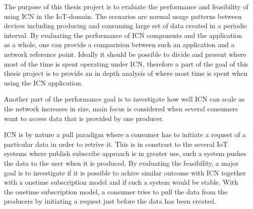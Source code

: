 The purpose of this thesis project is to evaluate the performance and feasibility of using ICN in the IoT-domain. The scenarios are normal usage patterns between devices including producing and consuming large set of data created in a periodic interval. By evaluating the performance of ICN components and the application as a whole, one can provide a comparision between such an application and a network reference point. Ideally it should be possible to divide and present where most of the time is spent operating under ICN, therefore a part of the goal of this thesis project is to provide an in depth analysis of where most time is spent when using the ICN application. 


Another part of the performance goal is to investigate how well ICN can scale as the network increases in size, main focus is considered when several consumers want to access data that is provided by one producer.

ICN is by nature a pull paradigm where a consumer has to initiate a request of a particular data in order to retrive it. This is in constrast to the several IoT systems where publish subscribe approach is in greater use, such a system pushes the data to the user when it is produced. By evaluating the feasibility, a major goal is to investigate if it is possible to achive similar outcome with ICN together with a onetime subscription model and if such a system would be stable. With the onetime subscription model, a consumer tries to pull the data from the producers by initiating a request just before the data has been created.

